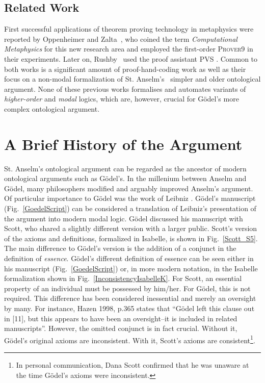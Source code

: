 \documentclass{article}
\begin{document}
\subsection{Related Work}

First successful applications of theorem proving technology in
metaphysics were reported by Oppenheimer and
Zalta~, who coined the term \textit{Computational Metaphysics} for this new research area and employed the first-order
\textsc{Prover9} \cite{prover9-mace4} in their experiments. Later on, Rushby~ used the proof assistant \textsc{PVS} \cite{cade92-pvs}. Common to both
works is a significant amount of proof-hand-coding work as well as their
focus on a non-modal formalization of St. Anselm's~ simpler 
and older ontological argument. 
None of these previous works formalises and automates variants of \emph{higher-order} and \emph{modal} logics, which are, however, crucial
for G\"{o}del's more complex ontological argument.


\section{A Brief History of the Argument}\label{sec:history}

St. Anselm's ontological argument \cite{Proslogion} can be regarded as
the ancestor of modern ontological arguments such as G\"odel's. In the
millenium between Anselm and G\"odel, many philosophers modified and
arguably improved Anselm's argument. Of particular importance to
G\"odel was the work of Leibniz \cite{ToDo:Leibniz}.  G\"odel's manuscript
(Fig.~\ref{GoedelScript}) can be considered a translation of Leibniz's
presentation of the argument into modern modal logic. G\"odel
discussed his manuscript with Scott, who shared a slightly different
version with a larger public. Scott's version of the axioms and
definitions, formalized in Isabelle, is shown in
Fig.~\ref{Scott_S5}. The main difference to G\"odel's version is the
addition of a conjunct in the definition of \emph{essence}. G\"odel's
different definition of essence can be seen either in his manuscript
(Fig.~\ref{GoedelScript}) or, in more modern notation, in the Isabelle
formalization shown in Fig.~\ref{InconsistencyIsabelleK}. For Scott,
an essential property of an individual must be possessed by
him/her. For G\"odel, this is not required. This difference has been
considered inessential and merely an oversight by many. For instance,
Hazen 1998, p.365 \cite[p.365]{Hazen} states that ``G\"odel left this
clause out in [11], but this appears to have been an oversight--it is
included in related manuscripts''. However, the omitted conjunct is in
fact crucial. Without it, G\"odel's original axioms are
inconsistent. With it, Scott's axioms are consistent\footnote{In
  personal communication, Dana Scott confirmed that he was unaware at
  the time G\"odel's axioms were inconsistent.}.
\end{document}
